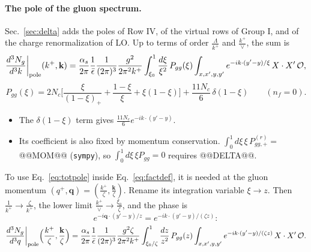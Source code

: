 \documentclass[10pt]{article}
\numberwithin{equation}{section}
\newcommand{\OO}{\mathcal O}
\newcommand{\pre}{\frac{1}{(2\pi)^3}\frac{g^2}{2\pi^2k^+}}
\begin{document}
\paragraph{The pole of the gluon spectrum.} Sec.~\ref{sec:delta} adds the poles of Row IV, of the virtual rows of Group I, and of the charge renormalization of LO. Up to terms of order $\frac{\Lambda}{k^+}$ and $\frac{k^+}{\vee}$, the sum is
\begin{equation}
\frac{d^3N_g}{d^3k}\bigg|_{\rm pole}(k^+,\mathbf k)=\frac{\alpha_s}{2\pi}\frac{1}{\bar\epsilon}\pre\int_{\xi_0}^1\frac{d\xi}{\xi^2}\,P_{gg}(\xi)\int_{x,x',y,y'}e^{-ik\cdot(y'-y)/\xi}\,X\cdot X'\,\OO ,
\label{eq:totpole}
\end{equation}
\begin{equation}
P_{gg}(\xi)=2N_c\Big[\frac{\xi}{(1-\xi)_+}+\frac{1-\xi}{\xi}+\xi(1-\xi)\Big]+\frac{11N_c}{6}\,\delta(1-\xi)\qquad(n_f=0).
\label{eq:Pgg}
\end{equation}
\begin{itemize}
\item The $\delta(1-\xi)$ term gives $\frac{11N_c}{6}e^{-ik\cdot(y'-y)}$.
\item Its coefficient is also fixed by momentum conservation. $\int_0^1d\xi\,\xi\,P^{(r)}_{gg,+}=$ @@MOM@@ (\texttt{sympy}), so $\int_0^1d\xi\,\xi P_{gg}=0$ requires @@DELTA@@.
\end{itemize}
To use Eq.~\eqref{eq:totpole} inside Eq.~\eqref{eq:factdef}, it is needed at the gluon momentum $(q^+,\mathbf q)=(\frac{k^+}{\zeta},\frac{\mathbf k}{\zeta})$. Rename its integration variable $\xi\to z$. Then $\frac{1}{k^+}\to\frac{\zeta}{k^+}$, the lower limit $\frac{k^+}{\vee}\to\frac{\xi_0}{\zeta}$, and the phase is
\begin{equation}
e^{-i\mathbf q\cdot(y'-y)/z}=e^{-ik\cdot(y'-y)/(\zeta z)}:
\end{equation}
\begin{equation}
\frac{d^3N_g}{d^3q}\bigg|_{\rm pole}\Big(\frac{k^+}{\zeta},\frac{\mathbf k}{\zeta}\Big)=\frac{\alpha_s}{2\pi}\frac{1}{\bar\epsilon}\frac{1}{(2\pi)^3}\frac{g^2\zeta}{2\pi^2k^+}\int_{\xi_0/\zeta}^1\frac{dz}{z^2}\,P_{gg}(z)\int_{x,x',y,y'}e^{-ik\cdot(y'-y)/(\zeta z)}\,X\cdot X'\,\OO .
\label{eq:polezeta}
\end{equation}
\end{document}
